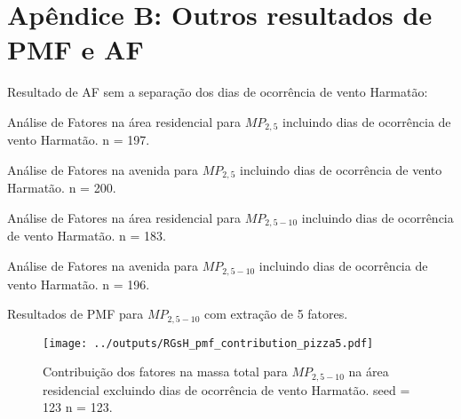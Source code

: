 \chapter{Apêndice B: Outros resultados de PMF e AF \label{apendice:pmf_fa}}

Resultado de AF sem a separação dos dias de ocorrência de vento Harmatão:

\begin{table}[H]
  \centering
  
  \caption{Análise de Fatores na área residencial para $MP_{2,5}$
          incluindo dias de ocorrência de vento Harmatão. n = 197.
          \label{table:AF_RFcH5}}
\end{table}

\begin{table}[H]
  \centering
  
  \caption{Análise de Fatores na avenida para $MP_{2,5}$
           incluindo dias de ocorrência de vento Harmatão. n = 200.
          \label{table:AF_TFcH5}}
\end{table}

\begin{table}[H]
  \centering
  
  \caption{Análise de Fatores na área residencial para $MP_{2,5-10}$
          incluindo dias de ocorrência de vento Harmatão. n = 183.
          \label{table:AG_RFcH4}}
\end{table}

\begin{table}[H]
  \centering
  
  \caption{Análise de Fatores na avenida para $MP_{2,5-10}$
           incluindo dias de ocorrência de vento Harmatão. n = 196.
          \label{table:AF_TGcH4}}
\end{table}

\begin{landscape}
  Resultados de PMF para $MP_{2,5-10}$ com extração de 5 fatores. 
  \begin{figure}
    \centering
    \begin{minipage}[b]{0.45\linewidth}
      \texttt{[image: ../outputs/RGsH\_pmf\_contribution\_pizza5.pdf]}
      \caption{Contribuição dos fatores na massa total para $MP_{2,5-10}$ na área
               residencial excluindo dias de ocorrência de vento Harmatão. seed = 123 n = 123.
               \label{fig:RGsH_contribution5}}
    \end{minipage}%
    \hspace{0.5cm}
    \begin{minipage}[b]{0.45\linewidth}
      
    \end{minipage}
  \end{figure}
\end{landscape}

